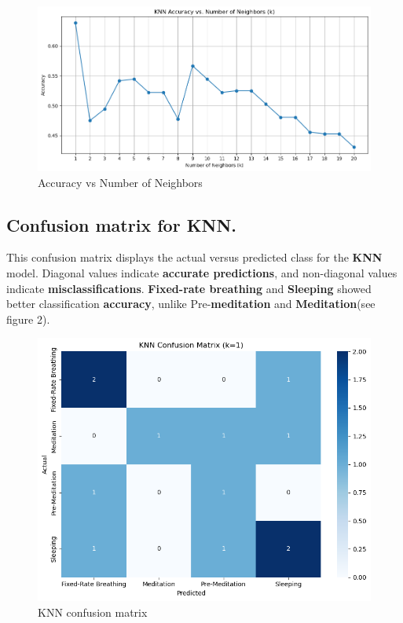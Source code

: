 \documentclass[
  11pt,
]{ieee}
\begin{document}
\begin{figure}

{\centering \includegraphics{picture_use_ml/1_Accuracy_for_KNN.png}

}

\caption{Accuracy vs Number of Neighbors}

\end{figure}%

\subsection{Confusion matrix for KNN.}\label{confusion-matrix-for-knn.}

\vspace{0.8em}

This confusion matrix displays the actual versus predicted class for the
\textbf{KNN} model. Diagonal values indicate \textbf{accurate
predictions}, and non-diagonal values indicate
\textbf{misclassifications}. \textbf{Fixed-rate breathing} and
\textbf{Sleeping} showed better classification \textbf{accuracy}, unlike
Pre-\textbf{meditation} and \textbf{Meditation}(see figure 2).

\begin{figure}

{\centering \includegraphics{picture_use_ml/2_Confusion_Matrix_for_KNN.png}

}

\caption{KNN confusion matrix}

\end{figure}%
\end{document}
